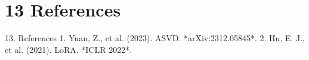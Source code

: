\section{13 References}

 13. References
1. Yuan, Z., et al. (2023). ASVD. *arXiv:2312.05845*.
2. Hu, E. J., et al. (2021). LoRA. *ICLR 2022*.
